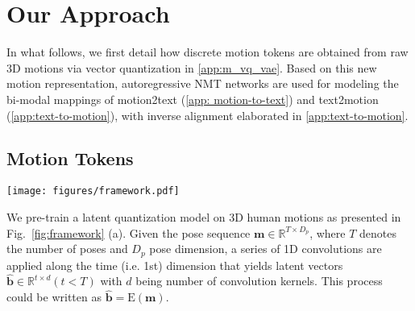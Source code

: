 \documentclass[runningheads]{llncs}
\newcommand{\beforefigcaption}{\vspace{-9mm}}
\newcommand{\afterfigcaption}{\vspace{-5mm}}
\newcommand{\beforesection}{\vspace{-2mm}}
\newcommand{\aftersection}{\vspace{-2mm}}
\newcommand{\beforesubsection}{\vspace{-2mm}}
\newcommand{\aftersubsection}{\vspace{-2mm}}
\begin{document}
\beforesection
\section{Our Approach}
\aftersection

In what follows, we first detail how discrete motion tokens are obtained from raw 3D motions via vector quantization in \cref{app:m_vq_vae}. Based on this new motion representation, autoregressive NMT networks are used for modeling the bi-modal mappings of motion2text (\cref{app: motion-to-text}) and text2motion (\cref{app:text-to-motion}), with inverse alignment elaborated in \cref{app:text-to-motion}.

\beforesubsection
\subsection{Motion Tokens}
\aftersubsection
\label{app:m_vq_vae}

\begin{figure*}[t]
	\centering
	\texttt{[image: figures/framework.pdf]}
		 \beforefigcaption
	\caption{\textbf{Approach overview.} (a) A 1D CNN based latent quantization model is firstly learned to reconstruct training motions. After training, a motion can be subsequently converted to a tuple of discrete motion tokens (i.e., codebook-indices). [BOM] and [EOM] are indicators of start and end added in a motion token sequence. (b-c) Mappings between motion and text tokens are modeled by autoregressive NMT networks and optimized by maximizing the log-likelihood of the targets ($\mathscr{L}_{NLL}$ and $\mathscr{L}_{NLL}^m$). (c) While training text2motion, motion tokens sampled from the resulting discrete distributions are inversely mapped to the text space via the learned motion2text model. Loss $\mathscr{L}_{NLL}^t$ penalizes the inverse alignment error. Finally, the 3D pose sequence is obtained by decoding motion tokens via the decoder $\mathrm{D}$ in (a).}
	\label{fig:framework}
	 \afterfigcaption
\end{figure*}

We pre-train a latent quantization model on 3D human motions as presented in Fig.~\ref{fig:framework} (a). Given the pose sequence $\mathbf{m} \in \mathbb{R}^{T\times D_p}$, where $T$ denotes the number of poses and $D_p$ pose dimension, a series of 1D convolutions are applied along the time (i.e. 1st) dimension that yields latent vectors $\mathbf{\hat{b}}\in \mathbb{R}^{t\times d} (t<T)$ with $d$ being number of convolution kernels. This process could be written as $\mathbf{\hat{b}}=\mathrm{E}(\mathbf{m})$. 
\end{document}
